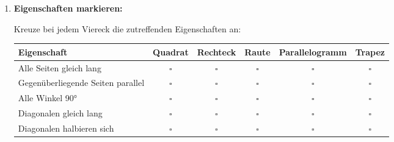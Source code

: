 \begin{enumerate}[label=\arabic*.]
    \vspace{1cm}

    \item \textbf{Eigenschaften markieren:}

    Kreuze bei jedem Viereck die zutreffenden Eigenschaften an:

    \begin{center}
        \begin{tabular}{|p{3cm}|c|c|c|c|c|}
            \hline
            \textbf{Eigenschaft} & \textbf{Quadrat} & \textbf{Rechteck} & \textbf{Raute} & \textbf{Parallelogramm} & \textbf{Trapez} \\
            \hline
            Alle Seiten gleich lang & $\square$ & $\square$ & $\square$ & $\square$ & $\square$ \\
            \hline
            Gegenüberliegende Seiten parallel & $\square$ & $\square$ & $\square$ & $\square$ & $\square$ \\
            \hline
            Alle Winkel 90° & $\square$ & $\square$ & $\square$ & $\square$ & $\square$ \\
            \hline
            Diagonalen gleich lang & $\square$ & $\square$ & $\square$ & $\square$ & $\square$ \\
            \hline
            Diagonalen halbieren sich & $\square$ & $\square$ & $\square$ & $\square$ & $\square$ \\
            \hline
        \end{tabular}
    \end{center}

\end{enumerate}